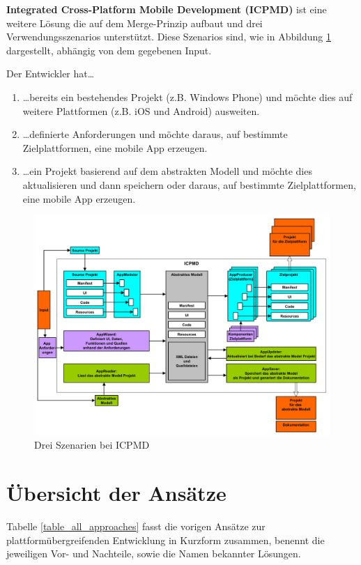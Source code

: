 \bigskip
\textbf{Integrated Cross-Platform Mobile Development (ICPMD)} ist eine weitere Lösung die auf dem Merge-Prinzip aufbaut und drei Verwendungsszenarios unterstützt. Diese Szenarios sind, wie in Abbildung \ref{graph_merge_integrated_based} dargestellt, abhängig von dem gegebenen Input.

\bigskip 
Der Entwickler hat…
 
\begin{enumerate}
	\item …bereits ein bestehendes Projekt (z.B. Windows Phone) und möchte dies auf weitere Plattformen (z.B. iOS und Android) ausweiten.
	
	\item …definierte Anforderungen und möchte daraus, auf bestimmte Zielplattformen, eine mobile App erzeugen.
	
	\item …ein Projekt basierend auf dem abstrakten Modell und möchte dies aktualisieren und dann speichern oder daraus, auf bestimmte Zielplattformen, eine mobile App erzeugen.
\end{enumerate}

\begin{figure}[htbp]
	\centering
	\includegraphics[width=1\textwidth]{Bilder/Merge_Integrated_based}
	\caption{Drei Szenarien bei ICPMD}\label{graph_merge_integrated_based}
\end{figure}

\section{Übersicht der Ansätze}
Tabelle \ref{table_all_approaches} fasst die vorigen Ansätze zur plattformübergreifenden Entwicklung in Kurzform zusammen, benennt die jeweiligen Vor- und Nachteile, sowie die Namen bekannter Lösungen.

